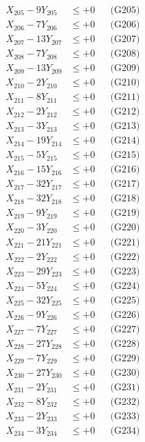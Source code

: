 \documentclass[a4paper,10pt]{article}
\begin{document}
{\begin{align}
X_{205} - 9Y_{205} &\leq +0 && \text{(G205)} \\
X_{206} - 7Y_{206} &\leq +0 && \text{(G206)} \\
X_{207} - 13Y_{207} &\leq +0 && \text{(G207)} \\
\allowbreak
X_{208} - 7Y_{208} &\leq +0 && \text{(G208)} \\
X_{209} - 13Y_{209} &\leq +0 && \text{(G209)} \\
X_{210} - 2Y_{210} &\leq +0 && \text{(G210)} \\
X_{211} - 8Y_{211} &\leq +0 && \text{(G211)} \\
X_{212} - 2Y_{212} &\leq +0 && \text{(G212)} \\
X_{213} - 3Y_{213} &\leq +0 && \text{(G213)} \\
X_{214} - 19Y_{214} &\leq +0 && \text{(G214)} \\
X_{215} - 5Y_{215} &\leq +0 && \text{(G215)} \\
X_{216} - 15Y_{216} &\leq +0 && \text{(G216)} \\
X_{217} - 32Y_{217} &\leq +0 && \text{(G217)} \\
\allowbreak
X_{218} - 32Y_{218} &\leq +0 && \text{(G218)} \\
X_{219} - 9Y_{219} &\leq +0 && \text{(G219)} \\
X_{220} - 3Y_{220} &\leq +0 && \text{(G220)} \\
X_{221} - 21Y_{221} &\leq +0 && \text{(G221)} \\
X_{222} - 2Y_{222} &\leq +0 && \text{(G222)} \\
X_{223} - 29Y_{223} &\leq +0 && \text{(G223)} \\
X_{224} - 5Y_{224} &\leq +0 && \text{(G224)} \\
X_{225} - 32Y_{225} &\leq +0 && \text{(G225)} \\
X_{226} - 9Y_{226} &\leq +0 && \text{(G226)} \\
X_{227} - 7Y_{227} &\leq +0 && \text{(G227)} \\
\allowbreak
X_{228} - 27Y_{228} &\leq +0 && \text{(G228)} \\
X_{229} - 7Y_{229} &\leq +0 && \text{(G229)} \\
X_{230} - 27Y_{230} &\leq +0 && \text{(G230)} \\
X_{231} - 2Y_{231} &\leq +0 && \text{(G231)} \\
X_{232} - 8Y_{232} &\leq +0 && \text{(G232)} \\
X_{233} - 2Y_{233} &\leq +0 && \text{(G233)} \\
X_{234} - 3Y_{234} &\leq +0 && \text{(G234)} \\

\end{align}}
\end{document}
